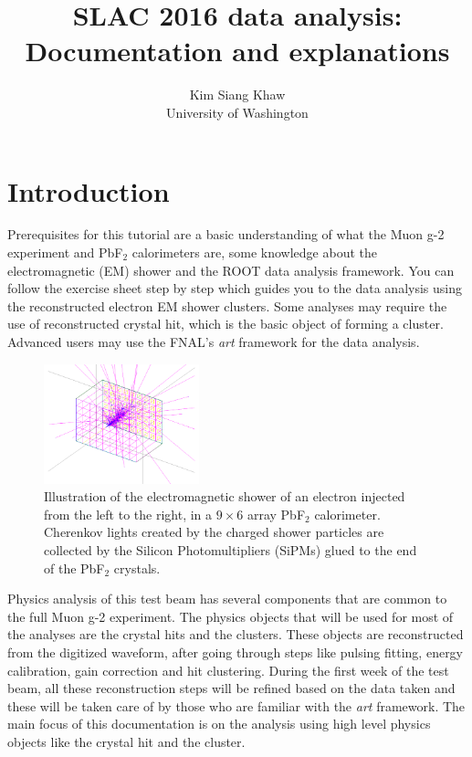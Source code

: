 \documentclass[12pt,letterpaper]{article}
\author{Kim Siang Khaw \\
University of Washington}
\title{\textbf{SLAC 2016 data analysis: Documentation and explanations}}
\begin{document}
\maketitle

\section{Introduction}
Prerequisites for this tutorial are a basic understanding of what the Muon g-2 experiment and PbF$_2$ calorimeters are, some knowledge about the electromagnetic (EM) shower
and the ROOT data analysis framework. You can follow the exercise sheet step by step which guides you to the data analysis using the reconstructed electron EM shower clusters.
Some analyses may require the use of reconstructed crystal hit, which is the basic object of forming a cluster. Advanced users may use the FNAL's \textit{art} framework for the data analysis.
%
\begin{figure}[htbp]
\centering
\includegraphics[trim=3cm 1cm 3cm 0cm, width=0.4\textwidth]{pics/EMShower}
\caption{Illustration of the electromagnetic shower of an electron injected from the left to the right, in a $9\times6$ array PbF$_2$ calorimeter. Cherenkov lights created by the charged shower particles are collected by the Silicon Photomultipliers (SiPMs) glued to the end of the PbF$_2$ crystals.}
\end{figure}

Physics analysis of this test beam has several components that are common to the full Muon g-2 experiment. The physics objects that will be used for most of the analyses are the crystal hits and the clusters.
These objects are reconstructed from the digitized waveform, after going through steps like pulsing fitting, energy calibration, gain correction and hit clustering. During the first week of the test beam, all these reconstruction steps
will be refined based on the data taken and these will be taken care of by those who are familiar with the \textit{art} framework. The main focus of this documentation is on the analysis using high level physics objects like the crystal hit and the cluster.
\end{document}
